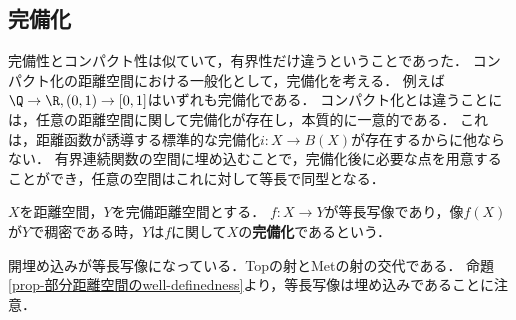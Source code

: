\documentclass[uplatex,dvipdfmx]{jsreport}
\begin{document}
\subsection{完備化}

\begin{tcolorbox}[colframe=ForestGreen, colback=ForestGreen!10!white, breakable ,colbacktitle=ForestGreen!40!white, coltitle=black,fonttitle=\bfseries\sffamily
    ,title=完備化]
    完備性とコンパクト性は似ていて，有界性だけ違うということであった．
    コンパクト化の距離空間における一般化として，完備化を考える．
    例えば$\Q\to\R,(0,1)\to[0,1]$はいずれも完備化である．
    コンパクト化とは違うことには，任意の距離空間に関して完備化が存在し，本質的に一意的である．
    これは，距離函数が誘導する標準的な完備化$i:X\to B(X)$が存在するからに他ならない．
    有界連続関数の空間に埋め込むことで，完備化後に必要な点を用意することができ，任意の空間はこれに対して等長で同型となる．
\end{tcolorbox}

\begin{definition}[completion]
    $X$を距離空間，$Y$を完備距離空間とする．
    $f:X\to Y$が等長写像であり，像$f(X)$が$Y$で稠密である時，$Y$は$f$に関して$X$の\textbf{完備化}であるという．
\end{definition}
\begin{remarks}
    開埋め込みが等長写像になっている．Topの射とMetの射の交代である．
    命題\ref{prop-部分距離空間のwell-definedness}より，等長写像は埋め込みであることに注意．
\end{remarks}
\end{document}
